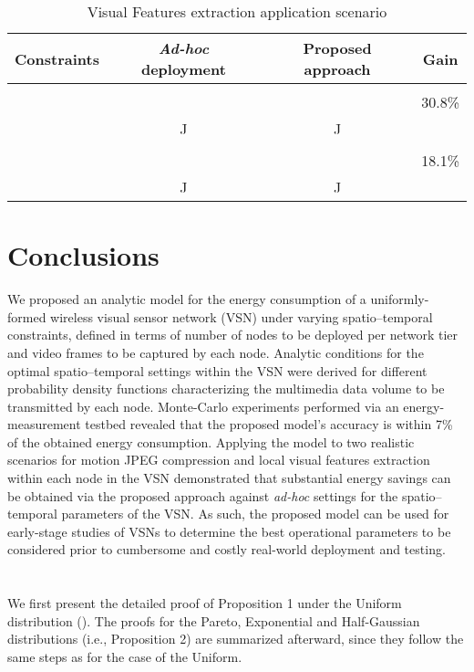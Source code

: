 \documentclass[twocolumn,english]{IEEEtran}
\providecommand{\tabularnewline}{\\}
\theoremstyle{plain}
\theoremstyle{definition}
\begin{document}
\begin{table}
\caption{Visual Features extraction application scenario \label{tab:apps-vf}}
\begin{tabular}{|c||c|c|c|}
\hline 
Constraints & \emph{Ad-hoc} deployment  & Proposed approach  & Gain \tabularnewline
\hline 
\hline 
 &   &   & \tabularnewline
  &   &   & 30.8\% \tabularnewline
  &  J  &  J  & \tabularnewline
\hline 
\hline 
 &   &   & \tabularnewline
  &   &   & 18.1\%\tabularnewline
  &  J  &  J  & \tabularnewline
\hline 
\end{tabular}
\end{table}



\section{Conclusions\label{sec:Conclusions}}

We proposed an analytic model for the energy consumption of a uniformly-formed
wireless visual sensor network (VSN) under varying spatio--temporal
constraints, defined in terms of number of nodes to be deployed per
network tier and video frames to be captured by each node. Analytic
conditions for the optimal spatio--temporal settings within the VSN
were derived for different probability density functions characterizing
the multimedia data volume to be transmitted by each node. Monte-Carlo
experiments performed via an energy-measurement testbed revealed that
the proposed model's accuracy is within 7\% of the obtained energy
consumption. Applying the model to two realistic scenarios for motion
JPEG compression and local visual features extraction within each
node in the VSN demonstrated that substantial energy savings can be
obtained via the proposed approach against \emph{ad-hoc} settings
for the spatio--temporal parameters of the VSN. As such, the proposed
model can be used for early-stage studies of VSNs to determine the
best operational parameters to be considered prior to cumbersome and
costly real-world deployment and testing.


\appendices{}


\section{\label{sec:Appendix-I}}

We first present the detailed proof of Proposition 1 under the Uniform
distribution (). The proofs for the Pareto, Exponential
and Half-Gaussian distributions (i.e., Proposition 2) are summarized
afterward, since they follow the same steps as for the case of the
Uniform.
\end{document}
